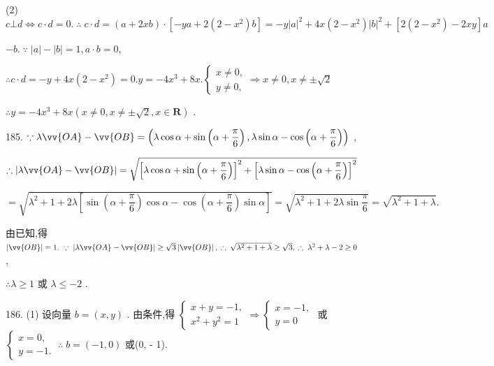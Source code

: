 (2) $c \bot  d \Leftrightarrow  c \cdot  d = 0.\;\therefore \;c \cdot  d = \left( {a + {2xb}}\right)  \cdot  \left\lbrack  {-{ya} + 2\left( {2 - {x}^{2}}\right) b}\right\rbrack   =  - y{\left| a\right| }^{2} + {4x}\left( {2 - {x}^{2}}\right) {\left| b\right| }^{2} + \left\lbrack  {2\left( {2 - {x}^{2}}\right)  - {2xy}}\right\rbrack  a$

$- b.\;\because \;\left| a\right|  - \left| b\right|  = 1,a \cdot  b = 0,$

$\therefore c \cdot  d =  - y + {4x}\left( {2 - {x}^{2}}\right)  = 0.y =  - 4{x}^{3} + {8x}.\left\{  {\begin{array}{l} x \neq  0, \\  y \neq  0, \end{array} \Rightarrow  x \neq  0,x \neq   \pm  \sqrt{2}}\right.$

$\therefore y =  - 4{x}^{3} + {8x}\left( {x \neq  0,x \neq   \pm  \sqrt{2},x \in  \mathbf{R}}\right)$ .

185. $\because \lambda \vv{OA} - \vv{OB} = \left( {\lambda \cos \alpha  + \sin \left( {\alpha  + \dfrac{\pi }{6}}\right) ,\lambda \sin \alpha  - \cos \left( {\alpha  + \dfrac{\pi }{6}}\right) }\right)$ ,

$\therefore \left| {\lambda \vv{OA} - \vv{OB}}\right|  = \sqrt{{\left\lbrack  \lambda \cos \alpha  + \sin \left( \alpha  + \dfrac{\pi }{6}\right) \right\rbrack  }^{2} + {\left\lbrack  \lambda \sin \alpha  - \cos \left( \alpha  + \dfrac{\pi }{6}\right) \right\rbrack  }^{2}}$

$= \sqrt{{\lambda }^{2} + 1 + {2\lambda }\left\lbrack  {\sin \left( {\alpha  + \dfrac{\pi }{6}}\right) \cos \alpha  - \cos \left( {\alpha  + \dfrac{\pi }{6}}\right) \sin \alpha }\right\rbrack  } = \sqrt{{\lambda }^{2} + 1 + {2\lambda }\sin \dfrac{\pi }{6}} = \sqrt{{\lambda }^{2} + 1 + \lambda }.$

由已知,得 $\left| \vv{OB}\right|  = 1.\;\because \;\left| {\lambda \vv{OA} - \vv{OB}}\right|  \geq  \sqrt{3}\left| \vv{OB}\right| ,\;\therefore \;\sqrt{{\lambda }^{2} + 1 + \lambda } \geq  \sqrt{3},\;\therefore \;{\lambda }^{2} + \lambda  - 2 \geq  0$ ,

$\therefore \lambda  \geq  1$ 或 $\lambda  \leq   - 2$ .

186. (1) 设向量 $b = \left( {x,y}\right)$ . 由条件,得 $\left\{  {\begin{array}{l} x + y =  - 1, \\  {x}^{2} + {y}^{2} = 1 \end{array} \Rightarrow  \left\{  \begin{array}{l} x =  - 1, \\  y = 0 \end{array}\right. }\right.$ 或 $\left\{  {\begin{array}{l} x = 0, \\  y =  - 1. \end{array}\;\therefore \;b = \left( {-1,0}\right) }\right.$ 或(0, - 1).

